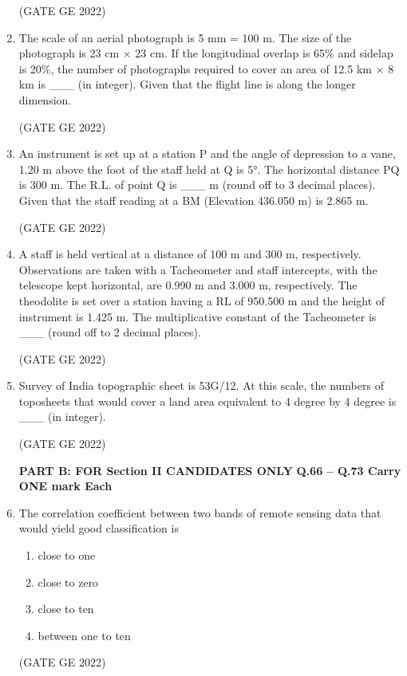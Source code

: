 \documentclass[a4paper, 11pt]{article}
\begin{document}
\begin{enumerate}
\hfill (GATE GE 2022)

\item The scale of an aerial photograph is 5 mm = 100 m. The size of the photograph is 23 cm × 23 cm. If the longitudinal overlap is 65\% and sidelap is 20\%, the number of photographs required to cover an area of 12.5 km × 8 km is \_\_\_ (in integer). Given that the flight line is along the longer dimension.

\hfill (GATE GE 2022)

\item An instrument is set up at a station P and the angle of depression to a vane, 1.20 m above the foot of the staff held at Q is 5°. The horizontal distance PQ is 300 m. The R.L. of point Q is \_\_\_ m (round off to 3 decimal places). Given that the staff reading at a BM (Elevation 436.050 m) is 2.865 m.

\hfill (GATE GE 2022)

\item A staff is held vertical at a distance of 100 m and 300 m, respectively. Observations are taken with a Tacheometer and staff intercepts, with the telescope kept horizontal, are 0.990 m and 3.000 m, respectively. The theodolite is set over a station having a RL of 950.500 m and the height of instrument is 1.425 m. The multiplicative constant of the Tacheometer is \_\_\_ (round off to 2 decimal places).

\hfill (GATE GE 2022)

\item Survey of India topographic sheet is 53G/12. At this scale, the numbers of toposheets that would cover a land area equivalent to 4 degree by 4 degree is \_\_\_ (in integer).

\hfill (GATE GE 2022)

\textbf{PART B: FOR Section II CANDIDATES ONLY }
\textbf{Q.66 – Q.73 Carry ONE mark Each}

\item The correlation coefficient between two bands of remote sensing data that would yield good classification is
\begin{enumerate}
    \item close to one
    \item close to zero
    \item close to ten
    \item between one to ten
\end{enumerate}

\hfill (GATE GE 2022)


\end{enumerate}
\end{document}
